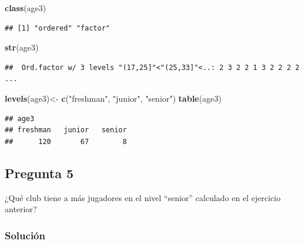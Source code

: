 \documentclass[]{article}
\newenvironment{Shaded}{\begin{snugshade}}{\end{snugshade}}
\newcommand{\KeywordTok}[1]{\textcolor[rgb]{0.13,0.29,0.53}{\textbf{#1}}}
\newcommand{\NormalTok}[1]{#1}
\newcommand{\OperatorTok}[1]{\textcolor[rgb]{0.81,0.36,0.00}{\textbf{#1}}}
\newcommand{\StringTok}[1]{\textcolor[rgb]{0.31,0.60,0.02}{#1}}
\begin{document}
\begin{Shaded}
\begin{Highlighting}[]
\KeywordTok{class}\NormalTok{(age3)}
\end{Highlighting}
\end{Shaded}

\begin{verbatim}
## [1] "ordered" "factor"
\end{verbatim}

\begin{Shaded}
\begin{Highlighting}[]
\KeywordTok{str}\NormalTok{(age3)}
\end{Highlighting}
\end{Shaded}

\begin{verbatim}
##  Ord.factor w/ 3 levels "(17,25]"<"(25,33]"<..: 2 3 2 2 1 3 2 2 2 2 ...
\end{verbatim}

\begin{Shaded}
\begin{Highlighting}[]
\KeywordTok{levels}\NormalTok{(age3)<-}\StringTok{ }\KeywordTok{c}\NormalTok{(}\StringTok{"freshman"}\NormalTok{, }\StringTok{"junior"}\NormalTok{, }\StringTok{"senior"}\NormalTok{)}
\KeywordTok{table}\NormalTok{(age3)}
\end{Highlighting}
\end{Shaded}

\begin{verbatim}
## age3
## freshman   junior   senior 
##      120       67        8
\end{verbatim}

\hypertarget{pregunta-5}{%
\subsection{Pregunta 5}\label{pregunta-5}}

¿Qué club tiene a más jugadores en el nivel ``senior'' calculado en el
ejercicio anterior?

\hypertarget{soluciuxf3n-4}{%
\subsubsection{Solución}\label{soluciuxf3n-4}}

\begin{Shaded}
\end{Shaded}
\end{document}
